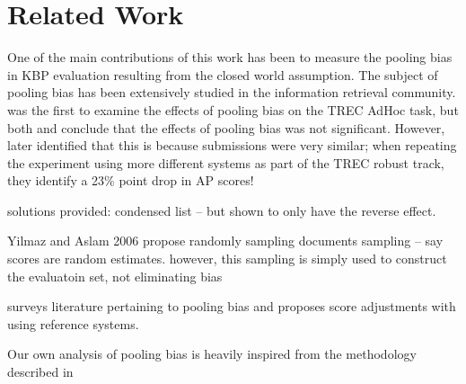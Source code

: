 \section{Related Work}
\label{sec:related}

One of the main contributions of this work has been to measure the pooling bias in KBP evaluation resulting from the closed world assumption.
The subject of pooling bias has been extensively studied in the information retrieval community.
\citep{zobel1998reliable} was the first to examine the effects of pooling bias on the TREC AdHoc task, but 
both \citet{zobel1998reliable} and \citet{voorhees199overview} conclude that the effects of pooling bias was not significant.
However, \citet{buckley2007bias} later identified that this is because submissions were very similar; when repeating the experiment using more different systems as part of the TREC robust track, they identify a 23\% point drop in AP scores!

solutions provided:
condensed list -- but shown to only have the reverse effect.

Yilmaz and Aslam 2006 propose randomly sampling documents sampling -- say scores are random estimates.
however, this sampling is simply used to construct the evaluatoin set, not eliminating bias


\citet{weber2010measurement} surveys literature pertaining to pooling bias and proposes score adjustments with using reference systems.

Our own analysis of pooling bias is heavily inspired from the methodology described in 




% 
% 
% 
% 

